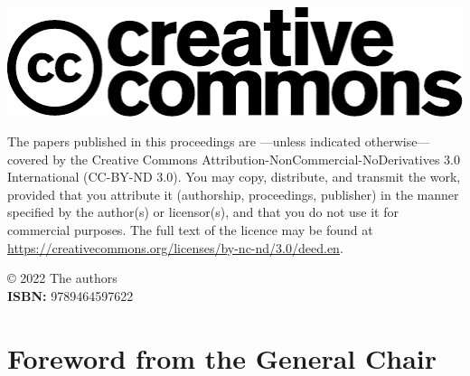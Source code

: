 \documentclass[a4paper,11pt,twoside]{book}
\newcommand{\newoddpage} {\clearpage
  \ifthenelse{\isodd{\value{page}}}{}
  {\thispagestyle{empty}\quad\newpage}}
\begin{document}
\begin{onehalfspacing}

\noindent \includegraphics[scale=0.5]{logos/creative_commons.pdf} 
\vspace{1em}

\noindent 
The papers published in this proceedings are ---unless indicated
otherwise--- covered by the Creative Commons
Attribution-NonCommercial-NoDerivatives 3.0 International (CC-BY-ND
3.0). You may copy, distribute, and transmit the work, provided that
you attribute it (authorship, proceedings, publisher) in the manner
specified by the author(s) or licensor(s), and that you do not use it
for commercial purposes. The full text of the licence may be found at
\url{https://creativecommons.org/licenses/by-nc-nd/3.0/deed.en}.

\vspace{1cm}

\noindent © 2022 The authors\\
\noindent \textbf{ISBN:} 9789464597622\\

\end{onehalfspacing}

\vfill \mbox{}


\newoddpage
\frontmatter

\tableofcontents


\chapter*{Foreword from the General Chair}
\end{document}
